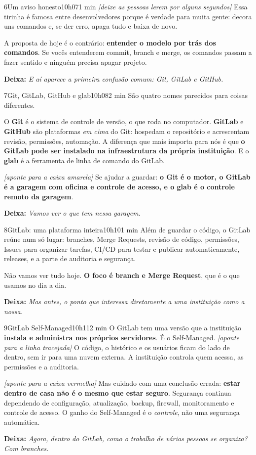 \documentclass[11pt,a4paper]{article}
\newcommand{\acao}[1]{{\color{ouroMB!75!black}\small\itshape [#1]}}
\newcommand{\deixa}[1]{\par{\color{verdeMB}\small\bfseries \faLongArrowAltRight\; Deixa:} {\small\itshape #1}}
\begin{document}
\begin{slide}{6}{Um aviso honesto}{10h07}{1 min}
\acao{deixe as pessoas lerem por alguns segundos}
Essa tirinha é famosa entre desenvolvedores porque é verdade para muita gente: decora uns comandos e, se der erro, apaga tudo e baixa de novo.

A proposta de hoje é o contrário: \textbf{entender o modelo por trás dos comandos}. Se vocês entenderem commit, branch e merge, os comandos passam a fazer sentido e ninguém precisa apagar projeto.
\deixa{E aí aparece a primeira confusão comum: Git, GitLab e GitHub.}
\end{slide}

\begin{slide}{7}{Git, GitLab, GitHub e glab}{10h08}{2 min}
São quatro nomes parecidos para coisas diferentes.

O \textbf{Git} é o sistema de controle de versão, o que roda no computador. \textbf{GitLab} e \textbf{GitHub} são plataformas \emph{em cima} do Git: hospedam o repositório e acrescentam revisão, permissões, automação. A diferença que mais importa para nós é que \textbf{o GitLab pode ser instalado na infraestrutura da própria instituição}. E o \textbf{glab} é a ferramenta de linha de comando do GitLab.

\acao{aponte para a caixa amarela}
Se ajudar a guardar: \textbf{o Git é o motor, o GitLab é a garagem com oficina e controle de acesso, e o glab é o controle remoto da garagem}.
\deixa{Vamos ver o que tem nessa garagem.}
\end{slide}

\begin{slide}{8}{GitLab: uma plataforma inteira}{10h10}{1 min}
Além de guardar o código, o GitLab reúne num só lugar: branches, Merge Requests, revisão de código, permissões, Issues para organizar tarefas, CI/CD para testar e publicar automaticamente, releases, e a parte de auditoria e segurança.

Não vamos ver tudo hoje. \textbf{O foco é branch e Merge Request}, que é o que usamos no dia a dia.
\deixa{Mas antes, o ponto que interessa diretamente a uma instituição como a nossa.}
\end{slide}

\begin{slide}{9}{GitLab Self-Managed}{10h11}{2 min}
O GitLab tem uma versão que a instituição \textbf{instala e administra nos próprios servidores}. É o Self-Managed. \acao{aponte para a linha tracejada} O código, o histórico e os usuários ficam do lado de dentro, sem ir para uma nuvem externa. A instituição controla quem acessa, as permissões e a auditoria.

\acao{aponte para a caixa vermelha}
Mas cuidado com uma conclusão errada: \textbf{estar dentro de casa não é o mesmo que estar seguro}. Segurança continua dependendo de configuração, atualização, backup, firewall, monitoramento e controle de acesso. O ganho do Self-Managed é o \emph{controle}, não uma segurança automática.
\deixa{Agora, dentro do GitLab, como o trabalho de várias pessoas se organiza? Com branches.}
\end{slide}
\end{document}
